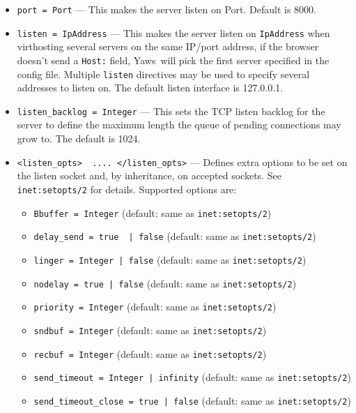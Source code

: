 \documentclass[11pt,oneside,english]{book}
\newcommand{\Yaws}            %
        {{\sc Yaws}}
\begin{document}
\begin{itemize}

\item       \verb+port = Port+ ---
              This makes the server listen on Port. Default is 8000.

\item        \verb+listen = IpAddress+ ---
              This makes the server listen on \verb+IpAddress+ when
              virthosting several servers on the same IP/port address, if
              the browser doesn't send a \verb+Host:+ field, \Yaws\ will
              pick the first server specified in the config file. Multiple
              \verb+listen+ directives may be used to specify several
              addresses to listen on. The default listen interface is
              127.0.0.1.

\item        \verb+listen_backlog = Integer+ ---
              This sets the TCP listen backlog for the server to
              define the maximum length the queue of pending
              connections may grow to. The default is 1024.


\item        \verb+<listen_opts>  .... </listen_opts>+ ---
              Defines extra options to be set on the listen socket and, by
              inheritance, on accepted sockets. See \verb+inet:setopts/2+ for
              details. Supported options are:
              \begin{itemize}
              \item \verb+Bbuffer = Integer+ (default: same as \verb+inet:setopts/2+)
              \item \verb+delay_send = true  | false+ (default: same as \verb+inet:setopts/2+)
              \item \verb+linger = Integer | false+ (default: same as \verb+inet:setopts/2+)
              \item \verb+nodelay = true | false+ (default: same as \verb+inet:setopts/2+)
              \item \verb+priority = Integer+ (default: same as \verb+inet:setopts/2+)
              \item \verb+sndbuf = Integer+ (default: same as \verb+inet:setopts/2+)
              \item \verb+recbuf = Integer+ (default: same as \verb+inet:setopts/2+)
              \item \verb+send_timeout = Integer | infinity+ (default: same as \verb+inet:setopts/2+)
              \item \verb+send_timeout_close = true | false+ (default: same as \verb+inet:setopts/2+)
              \end{itemize}


\end{itemize}
\end{document}
